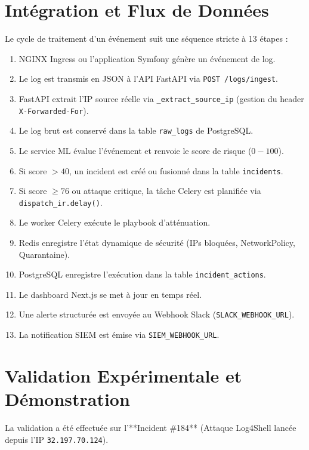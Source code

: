 \documentclass[12pt,a4paper]{report}
\begin{document}
\chapter{Intégration et Flux de Données}
Le cycle de traitement d'un événement suit une séquence stricte à 13 étapes :
\begin{enumerate}
    \item NGINX Ingress ou l'application Symfony génère un événement de log.
    \item Le log est transmis en JSON à l'API FastAPI via \texttt{POST /logs/ingest}.
    \item FastAPI extrait l'IP source réelle via \texttt{\_extract\_source\_ip} (gestion du header \texttt{X-Forwarded-For}).
    \item Le log brut est conservé dans la table \texttt{raw\_logs} de PostgreSQL.
    \item Le service ML évalue l'événement et renvoie le score de risque ($0 - 100$).
    \item Si score $> 40$, un incident est créé ou fusionné dans la table \texttt{incidents}.
    \item Si score $\ge 76$ ou attaque critique, la tâche Celery est planifiée via \texttt{dispatch\_ir.delay()}.
    \item Le worker Celery exécute le playbook d'atténuation.
    \item Redis enregistre l'état dynamique de sécurité (IPs bloquées, NetworkPolicy, Quarantaine).
    \item PostgreSQL enregistre l'exécution dans la table \texttt{incident\_actions}.
    \item Le dashboard Next.js se met à jour en temps réel.
    \item Une alerte structurée est envoyée au Webhook Slack (\texttt{SLACK\_WEBHOOK\_URL}).
    \item La notification SIEM est émise via \texttt{SIEM\_WEBHOOK\_URL}.
\end{enumerate}

\chapter{Validation Expérimentale et Démonstration}
La validation a été effectuée sur l'**Incident \#184** (Attaque Log4Shell lancée depuis l'IP \texttt{32.197.70.124}). 
\end{document}
